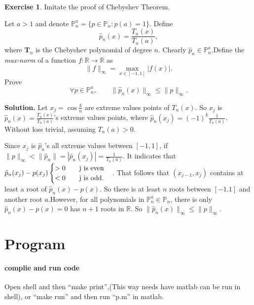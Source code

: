 \documentclass[a4paper]{book}
\newenvironment{solution}%
{\noindent\textbf{Solution.}}%
{\qedhere}
\numberwithin{equation}{chapter}
\theoremstyle{definition}
\newtheorem{exc}[exm]{Exercise}
\begin{document}
\begin{exc}
  Imitate the proof of Chebyshev Theorem.

  Let $a > 1$ and denote $\mathbb{P}^a_n = \{p \in \mathbb{P}_n \colon p(a) = 1\}$.
  Define
  \[ \hat{p}_n(x) = \frac{T_n(x)}{T_n(a)}, \]
  where $\mathbf{T}_n$ is the Chebyshev polynomial of degree $n$. Chearly $\hat{p}_n \in \mathbb{P}^a_n. $Define the \textit{max-norm} of a function $f\colon \mathbb{R} \rightarrow \mathbb{R}$ as
  \[ \lVert f \rVert_{\infty} = \max_{x \in [-1,1]} |f(x)|.\]
  Prove
  \[ \forall p \in \mathbb{P}^a_n, \qquad \lVert\hat{p}_n(x)\rVert_{\infty} \leq \lVert p \rVert_{\infty}.\]
\end{exc}

\begin{solution}
  Let $x_j = \cos\frac{k}{n} $ are extreme values points of $T_n(x)$. So $x_j$ is $\hat{p}_n(x) = \frac{T_n(x)}{T_n(a)}$'s extreme values points, where $\hat{p}_n(x_j) = (-1)^k \frac{1}{T_n(a)} $. Without loss trivial, assuming $T_n(a) > 0$.

  Since $x_j$ is $\hat{p}_n$'s all extreme values between $[-1,1]$, if $\lVert{p}\rVert_{\infty} < \lVert{\hat{p}_n}\rVert = |\hat{p}_n(x_j)| = \frac{1}{T_n(a)}$. It indicates that $\hat{p}_n(x_j) - p(x_j)
  \begin{cases}
    > 0 \qquad \textmd{j is even} \\
    < 0 \qquad \textmd{j is odd} .
  \end{cases}
  $. That follows that $(x_{j-1}, x_{j})$ contains at least a root of $\hat{p}_n(x) - p(x)$. So there is at least $n$ roots between $[-1.1]$ and another root $a$.However, for all polynomials in $\mathbb{P}^a_n \in \mathbb{P}_n$, there is only $\hat{p}_n(x) - p(x) = 0$ has $n + 1$ roots in $\mathbb{R}$. So $ \lVert\hat{p}_n(x)\rVert_{\infty} \leq \lVert p \rVert_{\infty}. $
\end{solution}

\section{Program}\label{sec:pro}

\paragraph{complie and run code}

Open shell and then ``make print'',(This way needs have matlab can be run in shell), or ``make run'' and then run ``p.m'' in matlab. 
\end{document}

